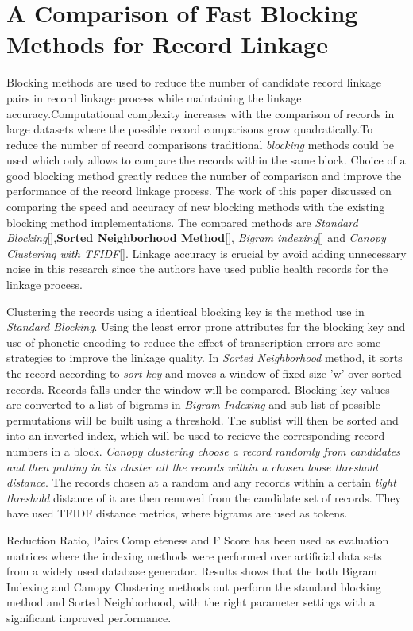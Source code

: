 \documentclass[a4paper]{article}
\begin{document}
\section*{A Comparison of Fast Blocking Methods for Record Linkage}
\cite{Baxter2003ALinkage} Blocking methods are used to reduce the number of candidate record linkage pairs in record linkage process while maintaining the linkage accuracy.Computational complexity increases with the comparison of records in large datasets where the possible record comparisons grow quadratically.To reduce the number of record comparisons traditional \textit{blocking} methods could be used which only allows to compare the records within the same block. Choice of a good blocking method greatly reduce the number of comparison and improve the performance of the record linkage process. The work of this paper discussed on comparing the speed and accuracy of new blocking methods with the existing blocking method implementations. The compared methods are \textit{Standard Blocking}[],\textbf{Sorted Neighborhood Method}[], \textit{Bigram indexing}[] and \textit{Canopy Clustering with TFIDF}[]. Linkage accuracy is crucial by avoid adding unnecessary noise in this research since the authors have used public health records for the linkage process.

Clustering the records using a identical blocking key is the method use in \textit{Standard Blocking}. Using the least error prone attributes for the blocking key and use of phonetic encoding to reduce the effect of transcription errors are some strategies to improve the linkage quality. In \textit{Sorted Neighborhood} method, it sorts the record according to \textit{sort key} and moves a window of fixed size 'w' over sorted records. Records falls under the window will be compared. Blocking key values are converted to a list of bigrams in \textit{Bigram Indexing}  and sub-list of possible permutations will be built using a threshold. The sublist will then be sorted and into an inverted index, which will be used to recieve the corresponding record numbers in a block. \textit{Canopy clustering choose a record randomly from candidates and then putting in its cluster all the records within a chosen \textit{loose threshold distance}}. The records chosen at a random and any records within a certain \textit{tight threshold} distance of it are then removed from the candidate set of records. They have used TFIDF distance metrics, where bigrams are used as tokens.

Reduction Ratio, Pairs Completeness and F Score has been used as evaluation matrices where the indexing methods were performed over artificial data sets from a widely used database generator. Results shows that the both Bigram Indexing and Canopy Clustering methods out perform the standard blocking method and Sorted Neighborhood, with the right parameter settings with a significant improved performance. 







 
\end{document}
